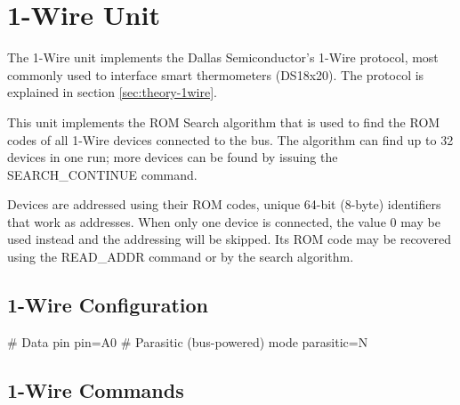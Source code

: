 \section{1-Wire Unit}

The 1-Wire unit implements the Dallas Semiconductor's 1-Wire protocol, most commonly used to interface smart thermometers (DS18x20). The protocol is explained in section \ref{sec:theory-1wire}.

This unit implements the ROM Search algorithm that is used to find the ROM codes of all 1-Wire devices connected to the bus. The algorithm can find up to 32 devices in one run; more devices can be found by issuing the SEARCH\_CONTINUE command.

Devices are addressed using their ROM codes, unique 64-bit (8-byte) identifiers that work as addresses. When only one device is connected, the value 0 may be used instead and the addressing will be skipped. Its ROM code may be recovered using the READ\_ADDR command or by the search algorithm.

\subsection{1-Wire Configuration}

\begin{inicode}
[1WIRE:ow@7]
# Data pin
pin=A0
# Parasitic (bus-powered) mode
parasitic=N
\end{inicode}

\subsection{1-Wire Commands}

